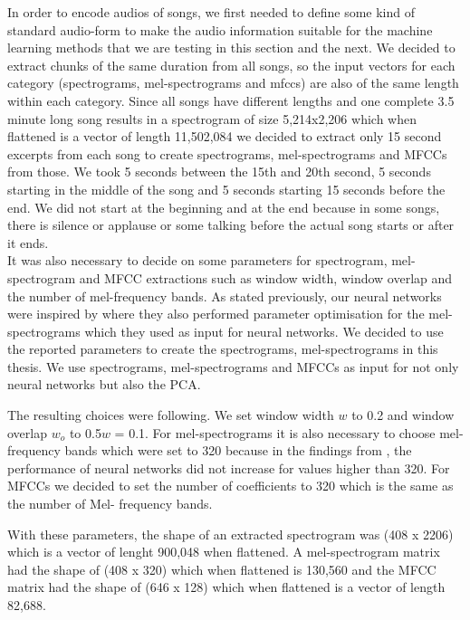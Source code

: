 In order to encode audios of songs, we first needed to define some kind of standard audio-form to make the audio information suitable for the machine learning methods that we are testing in this section and the next. We decided to extract chunks of the same duration from all songs, so the input vectors for each category (spectrograms, mel-spectrograms and mfccs) are also of the same length within each category. Since all songs have different lengths and one complete 3.5 minute long song results in a spectrogram of size 5,214x2,206 which when flattened is a vector of length 11,502,084 we decided to extract only 15 second excerpts from each song to create spectrograms, mel-spectrograms and MFCCs from those. We took 5 seconds between the 15th and 20th second, 5 seconds starting in the middle of the song and 5 seconds starting 15 seconds before the end. We did not start at the beginning and at the end because in some songs, there is silence or applause or some talking before the actual song starts or after it ends. \\

It was also necessary to decide on some parameters for spectrogram, mel-spectrogram and MFCC extractions such as window width, window overlap and the number of mel-frequency bands. As stated previously, our neural networks were inspired by \cite{inproceedings_RNNs} where they also performed parameter optimisation for the mel-spectrograms which they used as input for neural networks. We decided to use the reported parameters to create the spectrograms, mel-spectrograms in this thesis. We use spectrograms, mel-spectrograms and MFCCs as input for not only neural networks but also the PCA.

The resulting choices were following. We set window width $w$ to 0.2 and window overlap $w_o$ to 0.5$w$ = 0.1. For mel-spectrograms it is also necessary to choose mel-frequency bands which were set to 320 because in the findings from \cite{inproceedings_RNNs}, the performance of neural networks did not increase for values higher than 320. For MFCCs we decided to set the number of coefficients to 320 which is the same as the number of Mel- frequency bands.

With these parameters, the shape of an extracted spectrogram was (408 x 2206) which is a vector of lenght 900,048 when flattened. A mel-spectrogram matrix had the shape of (408 x 320) which when flattened is 130,560 and the MFCC matrix had the shape of (646 x 128) which when flattened is a vector of length 82,688.

